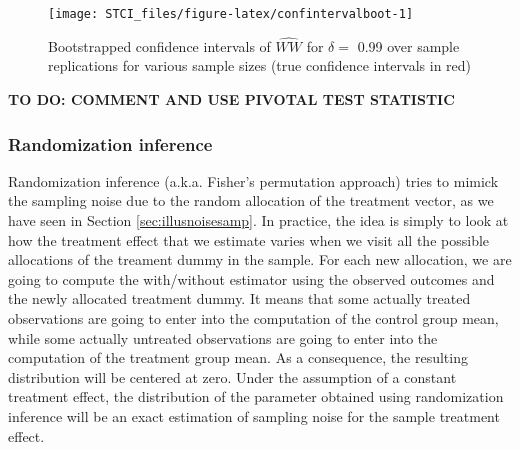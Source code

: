 \documentclass[]{book}
\newenvironment{Shaded}{\begin{snugshade}}{\end{snugshade}}
\newcommand{\KeywordTok}[1]{\textcolor[rgb]{0.13,0.29,0.53}{\textbf{#1}}}
\newcommand{\DataTypeTok}[1]{\textcolor[rgb]{0.13,0.29,0.53}{#1}}
\newcommand{\DecValTok}[1]{\textcolor[rgb]{0.00,0.00,0.81}{#1}}
\newcommand{\StringTok}[1]{\textcolor[rgb]{0.31,0.60,0.02}{#1}}
\newcommand{\OperatorTok}[1]{\textcolor[rgb]{0.81,0.36,0.00}{\textbf{#1}}}
\newcommand{\NormalTok}[1]{#1}
\theoremstyle{definition}
\theoremstyle{definition}
\theoremstyle{definition}
\theoremstyle{remark}
\begin{document}
\begin{Shaded}
\end{Shaded}

\begin{figure}[htbp]

{\centering \texttt{[image: STCI\_files/figure-latex/confintervalboot-1]} 

}

\caption{Bootstrapped confidence intervals of $\hat{WW}$ for $\delta=$ 0.99 over sample replications for various sample sizes (true confidence intervals in red)}\label{fig:confintervalboot}
\end{figure}

\textbf{TO DO: COMMENT AND USE PIVOTAL TEST STATISTIC}

\subsubsection{Randomization inference}\label{randomization-inference}

Randomization inference (a.k.a. Fisher's permutation approach) tries to
mimick the sampling noise due to the random allocation of the treatment
vector, as we have seen in Section \ref{sec:illusnoisesamp}. In
practice, the idea is simply to look at how the treatment effect that we
estimate varies when we visit all the possible allocations of the
treament dummy in the sample. For each new allocation, we are going to
compute the with/without estimator using the observed outcomes and the
newly allocated treatment dummy. It means that some actually treated
observations are going to enter into the computation of the control
group mean, while some actually untreated observations are going to
enter into the computation of the treatment group mean. As a
consequence, the resulting distribution will be centered at zero. Under
the assumption of a constant treatment effect, the distribution of the
parameter obtained using randomization inference will be an exact
estimation of sampling noise for the sample treatment effect.
\end{document}
